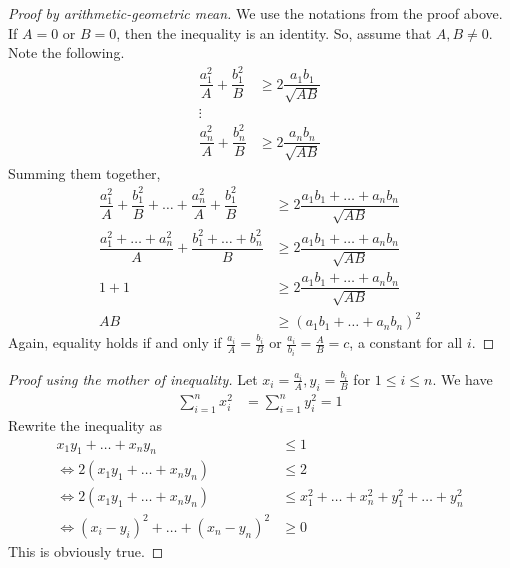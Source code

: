 \documentclass{subfile}
\begin{document}
		\begin{proof}[Proof by arithmetic-geometric mean]
			We use the notations from the proof above. If $A=0$ or $B=0$, then the inequality is an identity. So, assume that $A,B\neq0$. Note the following.
				\begin{align*}
					\dfrac{a_1^2}{A}+\dfrac{b_1^2}{B}
						& \geq2\dfrac{a_1b_1}{\sqrt{AB}}\\
					\vdots\\
					\dfrac{a_n^2}{A}+\dfrac{b_n^2}{B}
						& \geq2\dfrac{a_nb_n}{\sqrt{AB}}
				\end{align*}
			Summing them together,
				\begin{align*}
					\dfrac{a_1^2}{A}+\dfrac{b_1^2}{B}+\ldots+\dfrac{a_n^2}{A}+\dfrac{b_1^2}{B}
						& \geq2\dfrac{a_1b_1+\ldots+a_nb_n}{\sqrt{AB}}\\
					\dfrac{a_1^2+\ldots+a_n^2}{A}+\dfrac{b_1^2+\ldots+b_n^2}{B}
						& \geq2\dfrac{a_1b_1+\ldots+a_nb_n}{\sqrt{AB}}\\
					1+1
						& \geq2\dfrac{a_1b_1+\ldots+a_nb_n}{\sqrt{AB}}\\
					AB
						& \geq\left(a_1b_1+\ldots+a_nb_n\right)^2
				\end{align*}
			Again, equality holds if and only if $\frac{a_i}{A}=\frac{b_i}{B}$ or $\frac{a_i}{b_i}=\frac{A}{B}=c$, a constant for all $i$.
		\end{proof}
	
		\begin{proof}[Proof using the mother of inequality]
			Let $x_i=\frac{a_i}{A},y_i=\frac{b_i}{B}$ for $1\leq i\leq n$. We have
				\begin{align*}
					\sum_{i=1}^nx_i^2
						& = \sum_{i=1}^ny_i^2=1
				\end{align*}
			Rewrite the inequality as
				\begin{align*}
					x_1y_1+\ldots+x_ny_n
						& \leq1\\
					\iff2(x_1y_1+\ldots+x_ny_n)
						& \leq2\\
					\iff2(x_1y_1+\ldots+x_ny_n)
						& \leq x_1^2+\ldots+x_n^2+y_1^2+\ldots+y_n^2\\
					\iff(x_i-y_i)^2+\ldots+(x_n-y_n)^2
						& \geq0
				\end{align*}
			This is obviously true.
		\end{proof}
	
\end{document}

